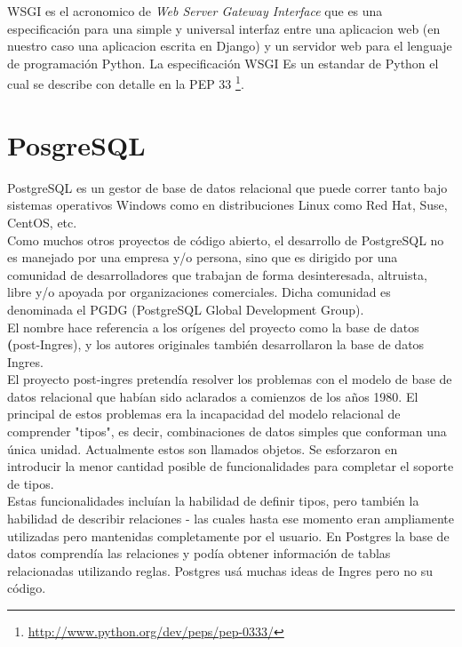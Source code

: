 WSGI es el acronomico de \textit{Web Server Gateway Interface} que es una especificación para una simple y universal interfaz entre una aplicacion web (en nuestro caso una aplicacion escrita en Django) y un servidor web para el lenguaje de programación Python.  La especificación WSGI Es un estandar de Python el cual se describe con detalle en la PEP 33 \footnote{\url{http://www.python.org/dev/peps/pep-0333/}}.\\[0.1cm]



\section{PosgreSQL}

PostgreSQL es un gestor de base de datos relacional que puede correr tanto bajo sistemas operativos Windows como en distribuciones Linux como Red Hat, Suse, CentOS, etc.\\[0.1cm]

Como muchos otros proyectos de código abierto, el desarrollo de PostgreSQL no es manejado por una empresa y/o persona, sino que es dirigido por una comunidad de desarrolladores que trabajan de forma desinteresada, altruista, libre y/o apoyada por organizaciones comerciales. Dicha comunidad es denominada el PGDG (PostgreSQL Global Development Group).\\[0.1cm]

El nombre hace referencia a los orígenes del proyecto como la base de datos \textbf(post-Ingres), y los autores originales también desarrollaron la base de datos Ingres. \\[0.1cm]

El proyecto post-ingres pretendía resolver los problemas con el modelo de base de datos relacional que habían sido aclarados a comienzos de los años 1980. El principal de estos problemas era la incapacidad del modelo relacional de comprender "tipos", es decir, combinaciones de datos simples que conforman una única unidad. Actualmente estos son llamados objetos. Se esforzaron en introducir la menor cantidad posible de funcionalidades para completar el soporte de tipos. \\[0.1cm]

Estas funcionalidades incluían la habilidad de definir tipos, pero también la habilidad de describir relaciones - las cuales hasta ese momento eran ampliamente utilizadas pero mantenidas completamente por el usuario. En Postgres la base de datos comprendía las relaciones y podía obtener información de tablas relacionadas utilizando reglas. Postgres usá muchas ideas de Ingres pero no su código. \\[0.1cm]

